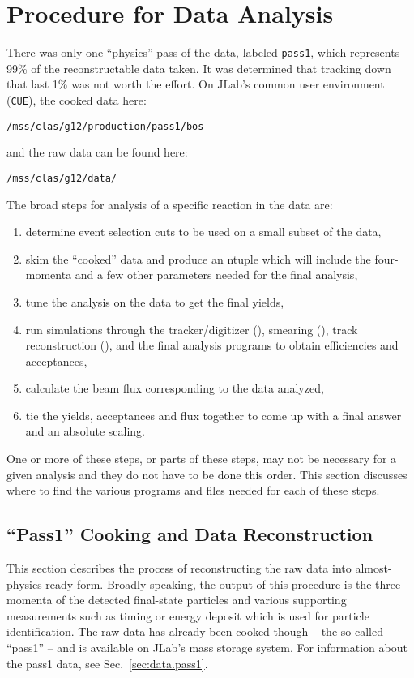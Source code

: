 \section{\label{sec:data}Procedure for Data Analysis}

There was only one ``physics'' pass of the  data, labeled \texttt{pass1}, which represents 99\% of the reconstructable data taken. It was determined that tracking down that last 1\% was not worth the effort. On JLab's common user environment (\texttt{CUE}), the cooked data here:
\begin{center}
    \texttt{/mss/clas/g12/production/pass1/bos}
\end{center}
and the raw data can be found here:
\begin{center}
    \texttt{/mss/clas/g12/data/}
\end{center}

The broad steps for analysis of a specific reaction in the  data are:
\begin{enumerate}
    \item determine event selection cuts to be used on a small subset of the data,
    \item skim the ``cooked'' data and produce an ntuple which will include the four-momenta and a few other parameters needed for the final analysis,
    \item tune the analysis on the data to get the final yields,
    \item run simulations through the tracker/digitizer (), smearing (), track reconstruction (), and the final analysis programs to obtain efficiencies and acceptances,
    \item calculate the beam flux corresponding to the data analyzed,
    \item tie the yields, acceptances and flux together to come up with a final answer and an absolute scaling.
\end{enumerate}
One or more of these steps, or parts of these steps, may not be necessary for a given analysis and they do not have to be done this order. This section discusses where to find the various programs and files needed for each of these steps.

\subsection{\label{sec:data.cook}``Pass1'' Cooking and Data Reconstruction}

This section describes the process of reconstructing the raw data into almost-physics-ready form. Broadly speaking, the output of this procedure is the three-momenta of the detected final-state particles and various supporting measurements such as timing or energy deposit which is used for particle identification. The raw data has already been cooked though -- the so-called ``pass1'' -- and is available on JLab's mass storage system. For information about the pass1 data, see Sec.~\ref{sec:data.pass1}.

